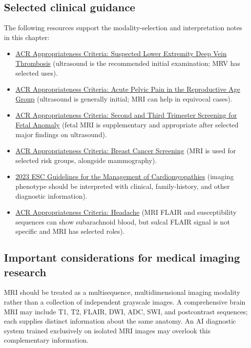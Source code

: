 \subsection{Selected clinical guidance}
The following resources support the modality-selection and interpretation notes in this chapter:
\begin{itemize}
\item \href{https://acsearch.acr.org/docs/69416/Narrative}{ACR Appropriateness Criteria: Suspected Lower Extremity Deep Vein Thrombosis} (ultrasound is the recommended initial examination; MRV has selected uses).
\item \href{https://acsearch.acr.org/docs/69503/narrative/}{ACR Appropriateness Criteria: Acute Pelvic Pain in the Reproductive Age Group} (ultrasound is generally initial; MRI can help in equivocal cases).
\item \href{https://acsearch.acr.org/docs/3102400/Narrative/}{ACR Appropriateness Criteria: Second and Third Trimester Screening for Fetal Anomaly} (fetal MRI is supplementary and appropriate after selected major findings on ultrasound).
\item \href{https://acsearch.acr.org/docs/3155692/Narrative}{ACR Appropriateness Criteria: Breast Cancer Screening} (MRI is used for selected risk groups, alongside mammography).
\item \href{https://www.acc.org/latest-in-cardiology/ten-points-to-remember/2023/08/30/02/53/2023-esc-guidelines-for-cardiomyopathies-esc-2023}{2023 ESC Guidelines for the Management of Cardiomyopathies} (imaging phenotype should be interpreted with clinical, family-history, and other diagnostic information).
\item \href{https://acsearch.acr.org/docs/69482/Narrative}{ACR Appropriateness Criteria: Headache} (MRI FLAIR and susceptibility sequences can show subarachnoid blood, but sulcal FLAIR signal is not specific and MRI has selected roles).
\end{itemize}

\subsection{Important considerations for medical imaging research}
MRI should be treated as a multisequence, multidimensional imaging modality rather than a collection of independent grayscale images. A comprehensive brain MRI may include T1, T2, FLAIR, DWI, ADC, SWI, and postcontrast sequences; each supplies distinct information about the same anatomy. An AI diagnostic system trained exclusively on isolated MRI images may overlook this complementary information.

